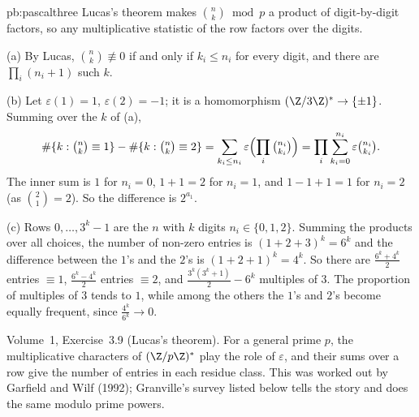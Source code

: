 \begin{solution}{pb:pascalthree}
\idea Lucas's theorem makes $\binom nk\bmod p$ a product of digit-by-digit factors, so any multiplicative statistic of the row
factors over the digits.

\writeup (a) By Lucas, $\binom nk\not\equiv0$ if and only if $k_i\le n_i$ for every digit, and there are $\prod_i(n_i+1)$ such $k$.

(b) Let $\varepsilon(1)=1$, $\varepsilon(2)=-1$; it is a homomorphism $(\Z/3\Z)^*\to\{\pm1\}$. Summing over the $k$ of (a),
\[
\#\{k:\tbinom nk\equiv1\}-\#\{k:\tbinom nk\equiv2\}=\sum_{k_i\le n_i}\varepsilon\Bigl(\prod_i\tbinom{n_i}{k_i}\Bigr)=\prod_i\sum_{k_i=0}^{n_i}\varepsilon\tbinom{n_i}{k_i}.
\]
The inner sum is $1$ for $n_i=0$, $1+1=2$ for $n_i=1$, and $1-1+1=1$ for $n_i=2$ (as $\binom21=2$). So the difference is $2^{a_1}$.

(c) Rows $0,\dots,3^k-1$ are the $n$ with $k$ digits $n_i\in\{0,1,2\}$. Summing the products over all choices,
the number of non-zero entries is $(1+2+3)^k=6^k$ and the difference between the $1$'s and the $2$'s is $(1+2+1)^k=4^k$. So there
are $\frac{6^k+4^k}2$ entries $\equiv1$, $\frac{6^k-4^k}2$ entries $\equiv2$, and $\frac{3^k(3^k+1)}2-6^k$ multiples of $3$. The proportion of
multiples of $3$ tends to $1$, while among the others the $1$'s and $2$'s become equally frequent, since $\frac{4^k}{6^k}\to0$.

\tools Volume~1, Exercise~3.9 (Lucas's theorem).
\leads For a general prime $p$, the multiplicative characters of $(\Z/p\Z)^*$ play the role of $\varepsilon$, and their sums over a
row give the number of entries in each residue class. This was worked out by Garfield and Wilf (1992); Granville's survey
listed below tells the story and does the same modulo prime powers.
\end{solution}

